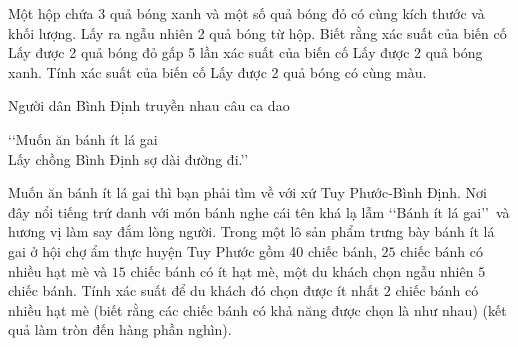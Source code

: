 \begin{ex}%
	Một hộp chứa 3 quả bóng xanh và một số quả bóng đỏ có cùng kích thước và khối lượng. Lấy ra ngẫu nhiên 2 quả bóng từ hộp. Biết rằng xác suất của biến cố \text{\lq\lq}Lấy được 2 quả bóng đỏ\text{\rq\rq} gấp 5 lần xác suất của biến cố \text{\lq\lq}Lấy được 2 quả bóng xanh\text{\rq\rq}. Tính  xác suất của biến cố \text{\lq\lq}Lấy được 2 quả bóng có cùng màu\text{\rq\rq}.
\end{ex}

\begin{bt}%
Người dân Bình Định truyền nhau câu ca dao
\begin{center}
\lq\lq Muốn ăn bánh ít lá gai\\
Lấy chồng Bình Định sợ dài đường đi.\rq\rq
\end{center}
Muốn ăn bánh ít lá gai thì bạn phải tìm về với xứ Tuy Phước-Bình Định. Nơi đây nổi tiếng trứ danh với món bánh nghe cái tên khá lạ lẫm \lq\lq Bánh ít lá gai\rq\rq\, và hương vị làm say đắm lòng người. Trong một lô sản phẩm trưng bày bánh ít lá gai ở hội chợ ẩm thực huyện Tuy Phước gồm 40 chiếc bánh, $25$ chiếc bánh có nhiều hạt mè và $15$ chiếc bánh có ít hạt mè, một du khách chọn ngẫu nhiên $5$ chiếc bánh. Tính xác suất để du khách đó chọn được ít nhất $2$ chiếc bánh có nhiều hạt mè (biết rằng các chiếc bánh có khả năng được chọn là như nhau) (kết quả làm tròn đến hàng phần nghìn).
\end{bt}

